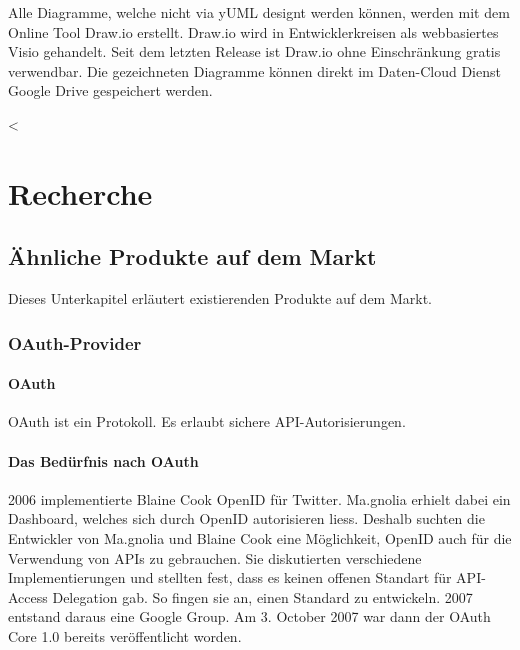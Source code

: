 Alle Diagramme, welche nicht via yUML designt werden können, werden mit
dem Online Tool Draw.io erstellt. Draw.io wird in Entwicklerkreisen als
webbasiertes Visio gehandelt. Seit dem letzten Release ist Draw.io ohne
Einschränkung gratis verwendbar. Die gezeichneten Diagramme können
direkt im Daten-Cloud Dienst Google Drive gespeichert werden.

\textless{}

\newpage

\chapter{Recherche}\label{recherche}

\section{Ähnliche Produkte auf dem
Markt}\label{uxe4hnliche-produkte-auf-dem-markt}

Dieses Unterkapitel erläutert existierenden Produkte auf dem Markt.

\hypertarget{oauth-provider}{\subsection{OAuth-Provider}\label{oauth-provider}}

\subsubsection{OAuth}\label{oauth}

OAuth ist ein Protokoll. Es erlaubt sichere API-Autorisierungen.

\subsubsection{Das Bedürfnis nach
OAuth}\label{das-beduxfcrfnis-nach-oauth}

2006 implementierte Blaine Cook OpenID für Twitter. Ma.gnolia erhielt
dabei ein Dashboard, welches sich durch OpenID autorisieren liess.
Deshalb suchten die Entwickler von Ma.gnolia und Blaine Cook eine
Möglichkeit, OpenID auch für die Verwendung von APIs zu gebrauchen. Sie
diskutierten verschiedene Implementierungen und stellten fest, dass es
keinen offenen Standart für API-Access Delegation gab. So fingen sie an,
einen Standard zu entwickeln. 2007 entstand daraus eine Google Group. Am
3. October 2007 war dann der OAuth Core 1.0 bereits veröffentlicht
worden.

